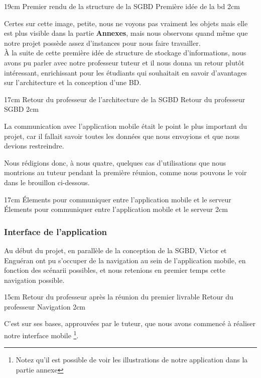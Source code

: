 {19cm}
{Premier rendu de la structure de la SGBD}
{Première idée de la bd}
{2cm}

Certes sur cette image, petite, nous ne voyons pas vraiment les objets mais elle est plus visible dans la partie \textbf{Annexes}, mais nous observons quand même que notre projet possède assez d'instances pour nous faire travailler.
\\
À la suite de cette première idée de structure de stockage d'informations, nous avons pu parler avec notre professeur tuteur et il nous donna un retour plutôt intéressant, enrichissant pour les étudiants qui souhaitait en savoir d'avantages sur l'architecture et la conception d'une BD.

{17cm}
{Retour du professeur de l'architecture de la SGBD}{
Retour du professeur SGBD}
{2cm}


La communication avec l'application mobile était le point le plus important du projet, car il fallait savoir toutes les données que nous envoyions et que nous devions restreindre.

Nous rédigions donc, à nous quatre, quelques cas d'utilisations que nous montrions au tuteur pendant la première réunion, comme nous pouvons le voir dans le brouillon ci-dessous.

{17cm}
{Élements pour communiquer entre l'application mobile et le serveur}{
Élements pour communiquer entre l'application mobile et le serveur}
{2cm}

\subsubsection{Interface de l'application}
Au début du projet, en parallèle de la conception de la SGBD, Victor et Enguéran ont pu s'occuper de la navigation au sein de l'application mobile, en fonction des scénarii possibles, et nous retenions en premier temps cette navigation possible.

{15cm}
{Retour du professeur après la réunion du premier livrable}{
Retour du professeur Navigation}
{2cm}

C'est sur ses bases, approuvées par le tuteur, que nous avons commencé à réaliser notre interface mobile \footnote{Notez qu'il est possible de voir les illustrations de notre application dans la partie annexe}.\\


